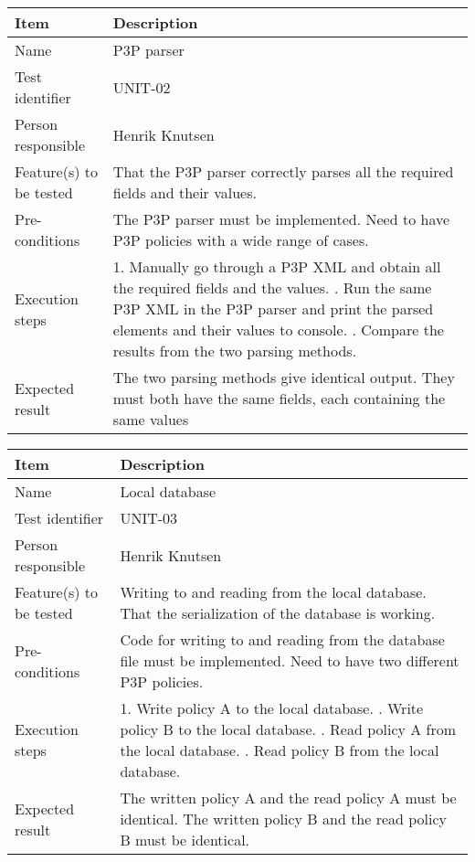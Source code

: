 \documentclass[12pt, fullpage, oneside]{report}
\begin{document}
		\begin{center}
			\begin{tabular}{ |  p{3.5cm} | p{10cm} | }
				\hline
				Item & Description \\ [5pt] \hline \hline
				Name & P3P parser \\  [5pt] \hline
				Test identifier & UNIT-02 \\  [5pt] \hline
				Person responsible & Henrik Knutsen \\  [5pt] \hline
				Feature(s) to be tested & That the P3P parser correctly parses all the required fields and their values. \\  [5pt] \hline
				Pre-conditions & The P3P parser must be implemented. Need to have P3P policies with a wide range of cases. \\  [5pt] \hline
				Execution steps & 1. Manually go through a P3P XML and obtain all the required fields and the values. \newline 2. Run the same P3P XML in the P3P parser and print the parsed elements and their values to console.
					\newline 3. Compare the results from the two parsing methods. \\  [5pt] \hline
				Expected result & The two parsing methods give identical output. They must both have the same fields, each containing the same values \\  [5pt] \hline
			\end{tabular}
		\end{center}
		
		\begin{center}
			\begin{tabular}{ |  p{3.5cm} | p{10cm} | }
				\hline
				Item & Description \\ [5pt] \hline \hline
				Name & Local database \\  [5pt] \hline
				Test identifier & UNIT-03 \\  [5pt] \hline
				Person responsible & Henrik Knutsen \\  [5pt] \hline
				Feature(s) to be tested & Writing to and reading from the local database. That the serialization of the database is working. \\  [5pt] \hline
				Pre-conditions & Code for writing to and reading from the database file must be implemented. Need to have two different P3P policies. \\  [5pt] \hline
				Execution steps & 1. Write policy A to the local database. \newline 2. Write policy B to the local database. \newline 3. Read policy A from the local database. \newline 4. Read policy B from the local database. \\  [5pt] \hline
				Expected result & The written policy A and the read policy A must be identical. \newline The written policy B and the read policy B must be identical. \\  [5pt] \hline
			\end{tabular}
		\end{center}
\end{document}

